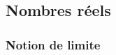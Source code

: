 %
%
%
%
%
%
%    
%
%
%
%
%
%
%
%
%
%

\subsection{Nombres réels}

\subsubsection{Notion de limite}

